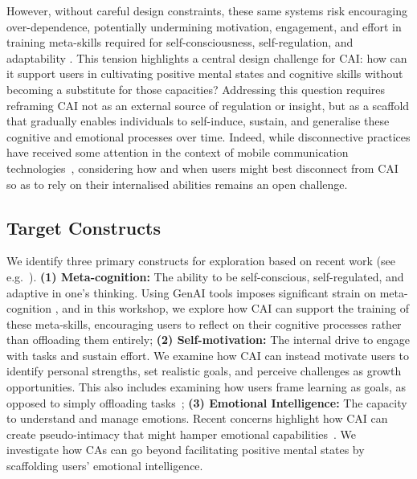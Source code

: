 \documentclass[manuscript,screen,review]{acmart}
\begin{document}
However, without careful design constraints, these same systems risk encouraging over-dependence, potentially undermining motivation, engagement, and effort in training meta-skills required for self-consciousness, self-regulation, and adaptability \cite{richards2023principlist}. 
This tension highlights a central design challenge for CAI: how can it support users in cultivating positive mental states and cognitive skills without becoming a substitute for those capacities? Addressing this question requires reframing CAI not as an external source of regulation or insight, but as a scaffold that gradually enables individuals to self-induce, sustain, and generalise these cognitive and emotional processes over time.
Indeed, while disconnective practices have received some attention in the context of mobile communication technologies~\cite{mannell2018typology}, considering how and when users might best disconnect from CAI so as to rely on their internalised abilities remains an open challenge.


\subsection{Target Constructs}
We identify three primary constructs for exploration based on recent work (see e.g.~\cite{Mitsea2024}). 
\textbf{(1) Meta-cognition:} The ability to be self-conscious, self-regulated, and adaptive in one's thinking. Using GenAI tools imposes significant strain on meta-cognition \cite{10.1145/3613904.3642902}, and in this workshop, we explore how CAI can support the training of these meta-skills, encouraging users to reflect on their cognitive processes rather than offloading them entirely;
\textbf{(2) Self-motivation:} The internal drive to engage with tasks and sustain effort. We examine how CAI can instead motivate users to identify personal strengths, set realistic goals, and perceive challenges as growth opportunities. This also includes examining how users frame learning as goals, as opposed to simply offloading tasks~\cite{Li14042025};
\textbf{(3) Emotional Intelligence:} The capacity to understand and manage emotions. Recent concerns highlight how CAI can create pseudo-intimacy that might hamper emotional capabilities~\cite{10.3389/fpsyg.2024.1410462}. We investigate how CAs can go beyond facilitating positive mental states by scaffolding users' emotional intelligence. 
\end{document}
